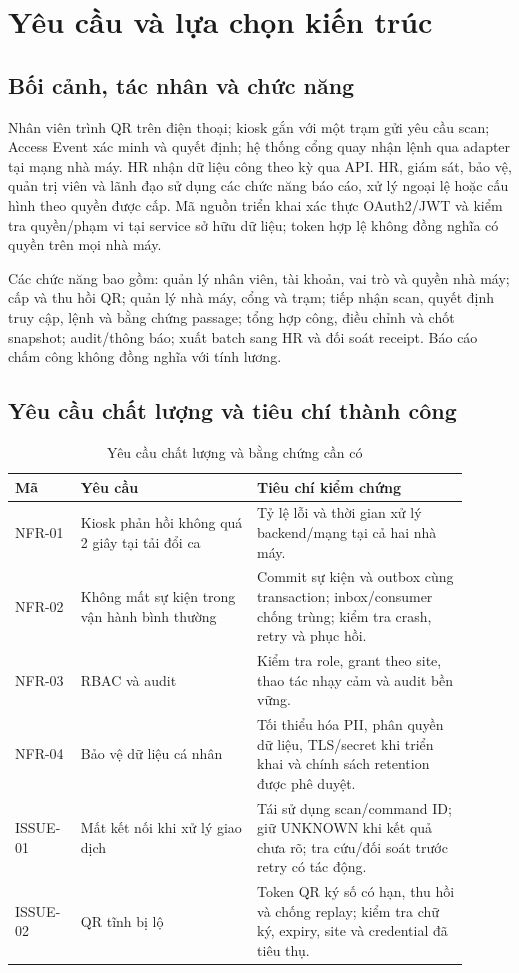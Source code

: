 ﻿\section{Yêu cầu và lựa chọn kiến trúc}
\label{sec:requirements-architecture}

\subsection{Bối cảnh, tác nhân và chức năng}
\label{subsec:actors}
Nhân viên trình QR trên điện thoại; kiosk gắn với một trạm gửi yêu cầu scan; Access Event xác minh và quyết định; hệ thống cổng quay nhận lệnh qua adapter tại mạng nhà máy. HR nhận dữ liệu công theo kỳ qua API. HR, giám sát, bảo vệ, quản trị viên và lãnh đạo sử dụng các chức năng báo cáo, xử lý ngoại lệ hoặc cấu hình theo quyền được cấp. Mã nguồn triển khai xác thực OAuth2/JWT và kiểm tra quyền/phạm vi tại service sở hữu dữ liệu; token hợp lệ không đồng nghĩa có quyền trên mọi nhà máy.

Các chức năng bao gồm: quản lý nhân viên, tài khoản, vai trò và quyền nhà máy; cấp và thu hồi QR; quản lý nhà máy, cổng và trạm; tiếp nhận scan, quyết định truy cập, lệnh và bằng chứng passage; tổng hợp công, điều chỉnh và chốt snapshot; audit/thông báo; xuất batch sang HR và đối soát receipt. Báo cáo chấm công không đồng nghĩa với tính lương.

\subsection{Yêu cầu chất lượng và tiêu chí thành công}
\label{subsec:quality-attributes}
\begin{table}[htbp]
\centering
\caption{Yêu cầu chất lượng và bằng chứng cần có}\label{tab:nfr}
\begin{tabular}{|>{\raggedright\arraybackslash}p{0.13\linewidth}|>{\raggedright\arraybackslash}p{0.35\linewidth}|>{\raggedright\arraybackslash}p{0.42\linewidth}|}\hline
\textbf{Mã} & \textbf{Yêu cầu} & \textbf{Tiêu chí kiểm chứng} \\\hline
NFR-01 & Kiosk phản hồi không quá 2 giây tại tải đổi ca & Tỷ lệ lỗi và thời gian xử lý backend/mạng tại cả hai nhà máy. \\\hline
NFR-02 & Không mất sự kiện trong vận hành bình thường & Commit sự kiện và outbox cùng transaction; inbox/consumer chống trùng; kiểm tra crash, retry và phục hồi. \\\hline
NFR-03 & RBAC và audit & Kiểm tra role, grant theo site, thao tác nhạy cảm và audit bền vững. \\\hline
NFR-04 & Bảo vệ dữ liệu cá nhân & Tối thiểu hóa PII, phân quyền dữ liệu, TLS/secret khi triển khai và chính sách retention được phê duyệt. \\\hline
ISSUE-01 & Mất kết nối khi xử lý giao dịch & Tái sử dụng scan/command ID; giữ UNKNOWN khi kết quả chưa rõ; tra cứu/đối soát trước retry có tác động. \\\hline
ISSUE-02 & QR tĩnh bị lộ & Token QR ký số có hạn, thu hồi và chống replay; kiểm tra chữ ký, expiry, site và credential đã tiêu thụ. \\\hline
\end{tabular}
\end{table}


